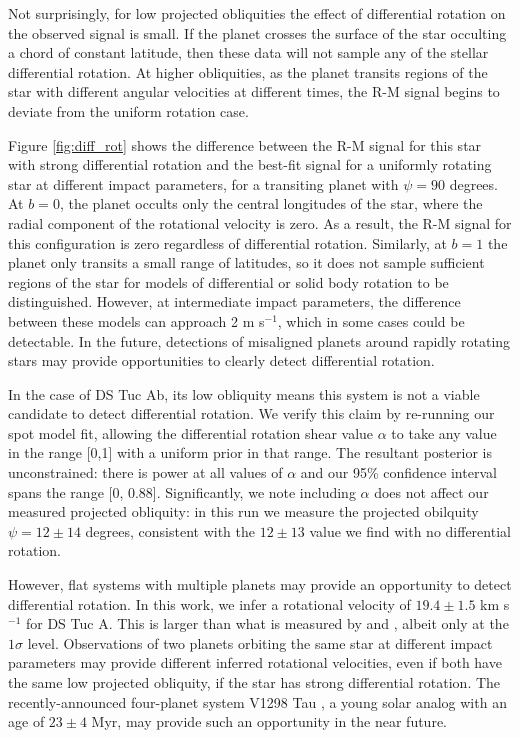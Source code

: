 \documentclass[twocolumn]{aastex63}
\begin{document}
Not surprisingly, for low projected obliquities the effect of differential rotation on the observed signal is small. If the planet crosses the surface of the star occulting a chord of constant latitude, then these data will not sample any of the stellar differential rotation. 
At higher obliquities, as the planet transits regions of the star with different angular velocities at different times, the R-M signal begins to deviate from the uniform rotation case.

Figure \ref{fig:diff_rot} shows the difference between the R-M signal for this star with strong differential rotation and the best-fit signal for a uniformly rotating star at different impact parameters, for a transiting planet with $\psi = 90$ degrees.
At $b=0$, the planet occults only the central longitudes of the star, where the radial component of the rotational velocity is zero. As a result, the R-M signal for this configuration is zero regardless of differential rotation.
Similarly, at $b=1$ the planet only transits a small range of latitudes, so it does not sample sufficient regions of the star for models of differential or solid body rotation to be distinguished.
However, at intermediate impact parameters, the difference between these models can approach 2 m s$^{-1}$, which in some cases could be detectable. 
In the future, detections of misaligned planets around rapidly rotating stars may provide opportunities to clearly detect differential rotation.

In the case of DS Tuc Ab, its low obliquity means this system is not a viable candidate to detect differential rotation. 
We verify this claim by re-running our spot model fit, allowing the differential rotation shear value $\alpha$ to take any value in the range [0,1] with a uniform prior in that range. 
The resultant posterior is unconstrained: there is power at all values of $\alpha$ and our 95\% confidence interval spans the range [0, 0.88]. 
Significantly, we note including $\alpha$ does not affect our measured projected obliquity: in this run we measure the projected obilquity $\psi = 12 \pm 14$ degrees, consistent with the $12 \pm 13$ value we find with no differential rotation.

However, flat systems with multiple planets may provide an opportunity to detect differential rotation.
In this work, we infer a rotational velocity of $19.4 \pm 1.5$ km s$^{-1}$ for DS Tuc A.
This is larger than what is measured by \citet{Benatti19} and \citet{Newton19}, albeit only at the $1\sigma$ level.
Observations of two planets orbiting the same star at different impact parameters may provide different inferred rotational velocities, even if both have the same low projected obliquity, if the star has strong differential rotation.
The recently-announced four-planet system V1298 Tau \citep{David19}, a young solar analog with an age of $23 \pm 4$ Myr, may provide such an opportunity in the near future.
\end{document}
